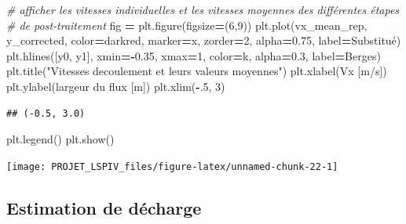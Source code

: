 \documentclass[
]{article}
\newenvironment{Shaded}{\begin{snugshade}}{\end{snugshade}}
\newcommand{\CommentTok}[1]{\textcolor[rgb]{0.56,0.35,0.01}{\textit{#1}}}
\newcommand{\DecValTok}[1]{\textcolor[rgb]{0.00,0.00,0.81}{#1}}
\newcommand{\FloatTok}[1]{\textcolor[rgb]{0.00,0.00,0.81}{#1}}
\newcommand{\NormalTok}[1]{#1}
\newcommand{\OperatorTok}[1]{\textcolor[rgb]{0.81,0.36,0.00}{\textbf{#1}}}
\newcommand{\StringTok}[1]{\textcolor[rgb]{0.31,0.60,0.02}{#1}}
\begin{document}
\begin{Shaded}
\begin{Highlighting}[]
\CommentTok{\# afficher les vitesses individuelles et les vitesses moyennes des différentes étapes }
\CommentTok{\# de post{-}traitement}
\NormalTok{fig }\OperatorTok{=}\NormalTok{ plt.figure(figsize}\OperatorTok{=}\NormalTok{(}\DecValTok{6}\NormalTok{,}\DecValTok{9}\NormalTok{))}
\NormalTok{plt.plot(vx\_mean\_rep, y\_corrected,}
\NormalTok{         color}\OperatorTok{=}\StringTok{\textquotesingle{}darkred\textquotesingle{}}\NormalTok{, marker}\OperatorTok{=}\StringTok{\textquotesingle{}x\textquotesingle{}}\NormalTok{, zorder}\OperatorTok{=}\DecValTok{2}\NormalTok{, alpha}\OperatorTok{=}\FloatTok{0.75}\NormalTok{, label}\OperatorTok{=}\StringTok{\textquotesingle{}Substitué\textquotesingle{}}\NormalTok{)}
\NormalTok{plt.hlines([y0, y1], xmin}\OperatorTok{={-}}\FloatTok{0.35}\NormalTok{, xmax}\OperatorTok{=}\DecValTok{1}\NormalTok{, color}\OperatorTok{=}\StringTok{\textquotesingle{}k\textquotesingle{}}\NormalTok{, alpha}\OperatorTok{=}\FloatTok{0.3}\NormalTok{, label}\OperatorTok{=}\StringTok{\textquotesingle{}Berges\textquotesingle{}}\NormalTok{)}
\NormalTok{plt.title(}\StringTok{"Vitesses d\textquotesingle{}ecoulement et leurs valeurs moyennes"}\NormalTok{)}
\NormalTok{plt.xlabel(}\StringTok{\textquotesingle{}Vx [m/s]\textquotesingle{}}\NormalTok{)}
\NormalTok{plt.ylabel(}\StringTok{\textquotesingle{}largeur du flux [m]\textquotesingle{}}\NormalTok{)}
\NormalTok{plt.xlim(}\OperatorTok{{-}}\FloatTok{.5}\NormalTok{, }\DecValTok{3}\NormalTok{)}
\end{Highlighting}
\end{Shaded}

\begin{verbatim}
## (-0.5, 3.0)
\end{verbatim}

\begin{Shaded}
\begin{Highlighting}[]
\NormalTok{plt.legend()}
\NormalTok{plt.show()}
\end{Highlighting}
\end{Shaded}

\texttt{[image: PROJET\_LSPIV\_files/figure-latex/unnamed-chunk-22-1]}

\hypertarget{estimation-de-duxe9charge}{%
\subsection*{Estimation de décharge}\label{estimation-de-duxe9charge}}
\end{document}
